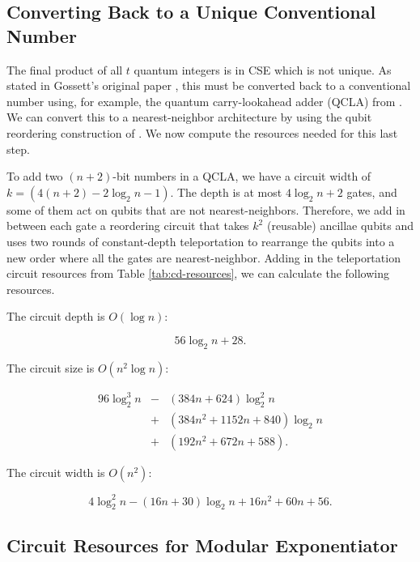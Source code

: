 \documentclass[twoside]{article}
\begin{document}
\subsection{Converting Back to a Unique Conventional Number}
\label{subsec:qcla}

The final product of all $t$ quantum integers is in CSE which is not
unique. As stated in Gossett's original paper \cite{Gossett1998}, this
must be converted back to a conventional number using, for example, the
quantum carry-lookahead adder (QCLA) from \cite{Draper2004}. We can convert
this to a nearest-neighbor architecture by using the qubit reordering
construction of \cite{Rosenbaum2012}. We now compute the resources
needed for this last step.

To add two $(n+2)$-bit numbers in a QCLA, we have a circuit width of
$k = (4(n+2) - 2\log_2 n - 1)$. The depth is at most $4\log_2 n +2$ gates,
and some of them act on qubits that are not nearest-neighbors. Therefore,
we add in between each gate a reordering circuit that takes $k^2$
(reusable) ancillae
qubits and uses two rounds of constant-depth teleportation to rearrange
the qubits into a new order where all the gates are nearest-neighbor.
Adding in the teleportation circuit resources from Table \ref{tab:cd-resources},
we can calculate the following resources.

The circuit depth is $O(\log n)$:

\begin{equation}
56\log_2 n + 28\text{.}
\end{equation}

The circuit size is $O(n^2 \log n)$:

\begin{eqnarray}
96 \log_2^3 n & - & (384n + 624)\log_2^2 n \nonumber \\
              & + & (384n^2 + 1152n + 840) \log_2 n \nonumber \\
              & + & (192n^2 + 672n + 588)\text{.}
\end{eqnarray}

The circuit width is $O(n^2)$:

\begin{equation}
4 \log_2^2 n - (16n + 30)\log_2 n + 16n^2 + 60n + 56\text{.}
\end{equation}


\subsection{Circuit Resources for Modular Exponentiator}
\label{subsec:modexp-resources}
\end{document}
